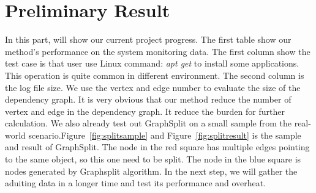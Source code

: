 

\section{Preliminary Result}

In this part, will show our current project progress. The first table show our method's performance on the system monitoring data. The first column show the test case is that user use Linux command: \textit{apt get} to install some applications. This operation is quite common in different environment. The second column is the log file size. We use the vertex and edge number to evaluate the size of the dependency graph. It is very obvious that our method reduce the number of vertex and edge in the dependency graph.  It reduce the burden for further calculation. We also already test out GraphSplit on a small sample from the real-world scenario.Figure~\ref{fig:splitsample} and Figure~\ref{fig:splitresult} is the sample and result of GraphSplit. The node in the red square has multiple edges pointing to the same object, so this one need to be split. The node in the blue square is nodes generated by Graphsplit algorithm. In the next step, we will gather the aduiting data in a longer time and test its performance and overheat. 


